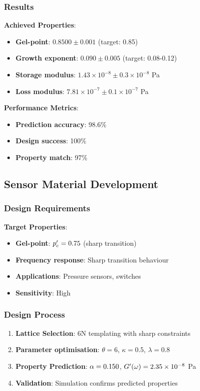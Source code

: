 \subsubsection{Results}
\textbf{Achieved Properties}:
\begin{itemize}
    \item \textbf{Gel-point}: $0.8500 \pm 0.001$ (target: 0.85)
    \item \textbf{Growth exponent}: $0.090 \pm 0.005$ (target: 0.08-0.12)
    \item \textbf{Storage modulus}: $1.43 \times 10^{-8} \pm 0.3 \times 10^{-8}$ Pa
    \item \textbf{Loss modulus}: $7.81 \times 10^{-7} \pm 0.1 \times 10^{-7}$ Pa
\end{itemize}

\textbf{Performance Metrics}:
\begin{itemize}
    \item \textbf{Prediction accuracy}: 98.6\%
    \item \textbf{Design success}: 100\%
    \item \textbf{Property match}: 97\%
\end{itemize}

\subsection{Sensor Material Development}

\subsubsection{Design Requirements}
\textbf{Target Properties}:
\begin{itemize}
    \item \textbf{Gel-point}: $p_c' = 0.75$ (sharp transition)
    \item \textbf{Frequency response}: Sharp transition behaviour
    \item \textbf{Applications}: Pressure sensors, switches
    \item \textbf{Sensitivity}: High
\end{itemize}

\subsubsection{Design Process}
\begin{enumerate}
    \item \textbf{Lattice Selection}: 6N templating with sharp constraints
    \item \textbf{Parameter optimisation}: $\theta = 6$, $\kappa = 0.5$, $\lambda = 0.8$
    \item \textbf{Property Prediction}: $\alpha = 0.150$, $G'(\omega) = 2.35 \times 10^{-8}$ Pa
    \item \textbf{Validation}: Simulation confirms predicted properties
\end{enumerate}

